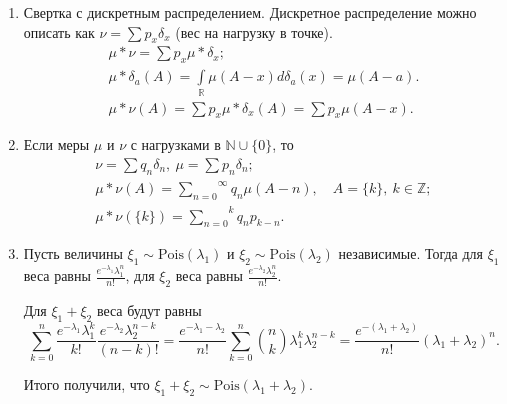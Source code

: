  \begin{examples}
\enewline
     \begin{enumerate}
         \item Свертка с дискретным распределением. Дискретное распределение можно описать как  $\nu = \sum p_x \delta_x$ (вес на нагрузку в точке).
        \begin{gather*}
            \mu*\nu = \sum p_x\mu*\delta_x;\\
            \mu*\delta_a(A) = \int\limits_\mathbb{R}\mu(A- x)d\delta_a(x) = \mu(A-a).\\
            \mu*\nu(A) = \sum p_x\mu*\delta_x(A) = \sum p_x\mu(A-x).
        \end{gather*}

         \item Если меры $\mu$ и $\nu$ с нагрузками в $\mathbb{N}\cup \{0\}$, то
\begin{gather*}
    \nu = \sum q_n\delta_n, \ \mu = \sum p_n\delta_n;\\
    \mu*\nu(A) = \overset{\infty}{\underset{n = 0}{\sum}} q_n\mu(A-n), \quad A = \{k\}, \ k\in\mathbb{Z}; \\
    \mu*\nu(\{k\}) = \overset{k}{\underset{n = 0}{\sum}}q_np_{k - n}.
\end{gather*}
     

         \item Пусть величины $\xi_1 \sim \text{Pois}(\lambda_1)$ и $\xi_2 \sim \text{Pois}(\lambda_2)$ независимые. Тогда
               для $\xi_1$ веса равны $\frac{e^{-\lambda_1}\lambda_1^n}{n!}$, для $\xi_2$ веса равны $\frac{e^{-\lambda_2}\lambda_2^n}{n!}$.

               Для $\xi_1+ \xi_2$ веса будут равны $$\overset{n}{\underset{k = 0}{\sum}}\frac{e^{-\lambda_1}\lambda_1^k}{k!}\frac{e^{-\lambda_2}\lambda_2^{n - k}}{(n - k)!} = \frac{e^{-\lambda_1 - \lambda_2}}{n!}\overset{n}{\underset{k = 0}{\sum}}\binom{n}{k} \lambda_1^k\lambda_2^{n - k} = \frac{e^{-(\lambda_1+\lambda_2)}}{n!}(\lambda_1+\lambda_2)^n.$$

               Итого получили, что $\xi_1+\xi_2\sim \text{Pois}(\lambda_1+\lambda_2)$.
     \end{enumerate}
 \end{examples}
\newpage
